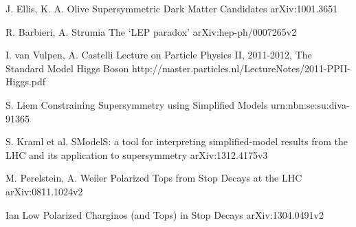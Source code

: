 
\begin{thebibliography}{2}
   
             {J. Ellis, K. A. Olive}
             {Supersymmetric Dark Matter Candidates}
             {arXiv:1001.3651}


             {R. Barbieri, A. Strumia}
             {The `LEP paradox'}
             {arXiv:hep-ph/0007265v2}

             {I. van Vulpen, A. Castelli}
             {Lecture on Particle Physics II, 2011-2012, The Standard Model Higgs Boson}
             {http://master.particles.nl/LectureNotes/2011-PPII-Higgs.pdf}




             {S. Liem}
             {Constraining Supersymmetry using Simplified Models}
             {urn:nbn:se:su:diva-91365}

             {S. Kraml et al.}
             {SModelS: a tool for interpreting simplified-model results from the LHC and its application to supersymmetry}
             {arXiv:1312.4175v3}


             {M. Perelstein, A. Weiler}
             {Polarized Tops from Stop Decays at the LHC}
             {arXiv:0811.1024v2}

             {Ian Low}
             {Polarized Charginos (and Tops) in Stop Decays}
             {arXiv:1304.0491v2}



\end{thebibliography}
